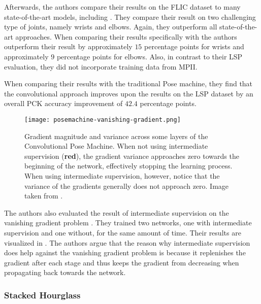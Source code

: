 Afterwards, the authors compare their results on the FLIC dataset to many state-of-the-art models, including \cite{toshev_deeppose:_2014} .
They compare their result on two challenging type of joints, namely wrists and elbows.
Again, they outperform all state-of-the-art approaches.
When comparing their results specifically with \cite{toshev_deeppose:_2014} the authors outperform their result by approximately $15$ percentage points for wrists and approximately $9$ percentage points for elbows.
Also, in contrast to their LSP evaluation, they did not incorporate training data from MPII.


When comparing their results with the traditional Pose machine, they find that the convolutional approach improves upon the results on the LSP dataset by an overall PCK accuracy improvement of $42.4$ percentage points.


\begin{figure}[htb!]
    \centering
    \texttt{[image: posemachine-vanishing-gradient.png]}
    \caption{Gradient magnitude and variance across some layers of the Convolutional Pose Machine. When not using intermediate supervision (\textbf{red}), the gradient variance approaches zero towards the beginning of the network, effectively stopping the learning process.  When using intermediate supervision, however, notice that the variance of the gradients generally does not approach zero. Image taken from \cite{wei_convolutional_2016}.}
    \label{fig:pose-machine-vanishing-gradient}
\end{figure}

The authors also evaluated the result of intermediate supervision on the vanishing gradient problem . 
They trained two networks, one with intermediate supervision and one without, for the same amount of time.
Their results are visualized in .
The authors argue that the reason why intermediate supervision does help against the vanishing gradient problem is because it replenishes the gradient after each stage and thus keeps the gradient from decreasing when propagating back towards the network.

\subsubsection{Stacked Hourglass}

